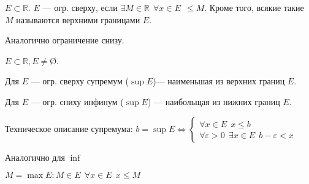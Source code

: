 \begin{definition}
$E\subset \mathbb{R}$. $E$ --- огр. сверху, если $\exists M\in\mathbb{R} \ \ \forall x\in E \ \ \leq M$. Кроме того, всякие такие $M$ называются верхними границами $E$.
\end{definition}

Аналогично ограничение снизу.

\begin{definition}
$E\subset \mathbb{R}, E\not=$\O.

Для $E$ --- огр. сверху супремум ($\sup E$)--- наименьшая из верхних границ $E$.

Для $E$ --- огр. сниху инфинум ($\sup E$) --- наибольщая из нижних границ $E$.
\end{definition}

\begin{remark}
Техническое описание супремума:
$b=\sup E \Leftrightarrow \begin{cases}
    \forall x\in E \ \ x\leq b \\
    \forall \varepsilon > 0 \ \ \exists x\in E \ \ b-\varepsilon<x
\end{cases}$
\end{remark}

Аналогично для $\inf$

\begin{definition}
$M=\max E : M\in E \ \ \forall x\in E \ \ x\leq M$
\end{definition}

